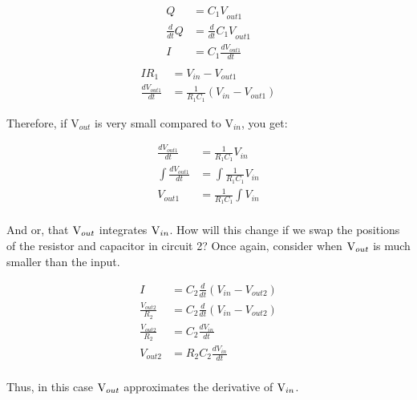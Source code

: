 \documentclass[12pt]{report}
\newcommand{\pr}[1]{\left(#1\right)}
\newcommand{\V}{{\rm V}}
\begin{document}
\begin{equation} \label{cap2}
\begin{split}
{Q} &= {C_1V}_{out1}\\
\frac{d}{dt}{Q} &= \frac{d}{dt}{C_1V}_{out1} \\
{I} &= {C_1}\frac{d{V}_{out1}}{dt} \\
\end{split}
\end{equation}
\begin{equation} \label{cap3}
\begin{split}
{IR}_1 &= V_{in} - V_{out1} \\
\frac{d{V}_{out1}}{dt} &= \frac{1}{{R}_1 C_1}\pr{V_{in} - V_{out1}}
\end{split}
\end{equation}\newline

Therefore, if V$_{out}$ is very small compared to V$_{in}$, you get: 

\begin{equation} \label{cap4}
\begin{split}
\frac{d{V}_{out1}}{dt} &= \frac{1}{{R}_1 C_1}V_{in}\\
\int \frac{d{V}_{out1}}{dt} &= \int \frac{1}{{R}_1 C_1}V_{in}\\
{V}_{out1} &= \frac{1}{{R}_1 C_1} \int V_{in}\\
\end{split}
\end{equation}

And or, that $\V_{out}$ integrates $\V_{in}$. How will this change if we swap the positions of the resistor and capacitor in circuit 2? Once again, consider when $\V_{out}$ is much smaller than the input. 

\begin{equation} \label{cap5}
\begin{split}
{I} &= {C_2}\frac{d}{dt} \pr{V_{in} - V_{out2}}\\
{\frac{V_{out2}}{R_2}} &= {C_2}\frac{d}{dt} \pr{V_{in} - V_{out2}}\\
{\frac{V_{out2}}{R_2}} &= {C_2}\frac{d V_{in}}{dt}\\
V_{out2} &= R_2{C_2}\frac{d V_{in}}{dt}\\
\end{split}
\end{equation}\newline

Thus, in this case $\V_{out}$ approximates the derivative of $\V_{in}$. 
\end{document}
